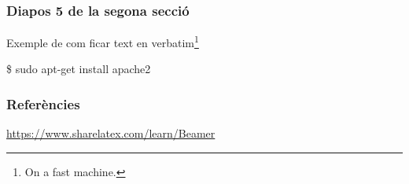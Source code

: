\documentclass{beamer}
\begin{document}
\begin{frame}
	\frametitle{Diapos 5 de la segona secció}
	Exemple de com ficar text en verbatim\footnote{On a fast machine.}
	\begin{semiverbatim}
		\$ sudo apt-get install apache2
	\end{semiverbatim}
\end{frame}

\begin{frame}
	\frametitle{Referències}
	\begin{thebibliography}{99}
		 \url{https://www.sharelatex.com/learn/Beamer}
	\end{thebibliography}
\end{frame}
\end{document}
